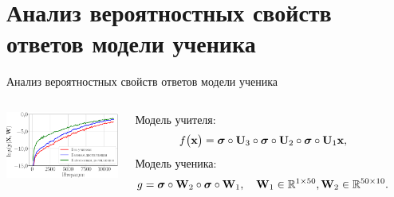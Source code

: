 \documentclass[10pt,pdf,hyperref={unicode}]{beamer}
\begin{document}
\section{Анализ вероятностных свойств ответов модели ученика}
\begin{frame}{Анализ вероятностных свойств ответов модели ученика}
\justifying
~\\[-4mm]
\begin{columns}
\includegraphics[width=\textwidth]{figures/synthetic_likelihood_2_layers.eps}

Модель учителя:
$$
\setlength\abovedisplayskip{0pt}
f\bigr(\mathbf{x}\bigr) = \bm{\sigma} \circ \mathbf{U}_3\circ \bm{\sigma} \circ \mathbf{U}_2\circ\bm{\sigma}\circ \mathbf{U}_1\mathbf{x},
\setlength\belowdisplayskip{0pt}
$$
Модель ученика:
$$
\setlength\abovedisplayskip{0pt}
g = \bm{\sigma} \circ \mathbf{W}_2 \circ \bm{\sigma} \circ \mathbf{W}_1, \quad \mathbf{W}_{1} \in \mathbb{R}^{1 \times 50}, \mathbf{W}_{2} \in \mathbb{R}^{50 \times 10}.
\setlength\belowdisplayskip{0pt}
$$
\vspace{-0.8cm}
\begin{table}[]
\begin{center}
\end{center}
\end{table}
\end{columns}


\end{frame}
\end{document}
